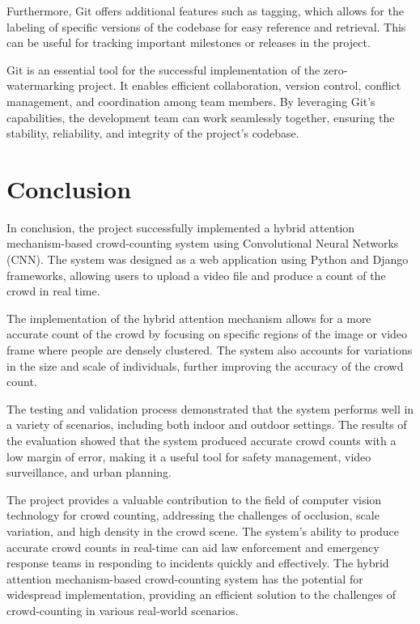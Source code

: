 \documentclass[12pt]{report}
\begin{document}
Furthermore, Git offers additional features such as tagging, which allows for the labeling of specific versions of the codebase for easy reference and retrieval. This can be useful for tracking important milestones or releases in the project.
\newline

Git is an essential tool for the successful implementation of the zero-watermarking project. It enables efficient collaboration, version control, conflict management, and coordination among team members. By leveraging Git's capabilities, the development team can work seamlessly together, ensuring the stability, reliability, and integrity of the project's codebase.
\newline



\chapter{Conclusion}


In conclusion, the project successfully implemented a hybrid attention mechanism-based crowd-counting system using Convolutional Neural Networks (CNN). The system was designed as a web application using Python and Django frameworks, allowing users to upload a video file and produce a count of the crowd in real time.
\newline

The implementation of the hybrid attention mechanism allows for a more accurate count of the crowd by focusing on specific regions of the image or video frame where people are densely clustered. The system also accounts for variations in the size and scale of individuals, further improving the accuracy of the crowd count.
\newline

The testing and validation process demonstrated that the system performs well in a variety of scenarios, including both indoor and outdoor settings. The results of the evaluation showed that the system produced accurate crowd counts with a low margin of error, making it a useful tool for safety management, video surveillance, and urban planning.
\newline

The project provides a valuable contribution to the field of computer vision technology for crowd counting, addressing the challenges of occlusion, scale variation, and high density in the crowd scene. The system's ability to produce accurate crowd counts in real-time can aid law enforcement and emergency response teams in responding to incidents quickly and effectively. The hybrid attention mechanism-based crowd-counting system has the potential for widespread implementation, providing an efficient solution to the challenges of crowd-counting in various real-world scenarios.
\newline
\end{document}
